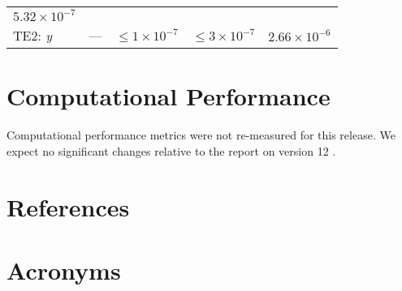 \documentclass[DM,lsstdraft,toc]{lsstdoc}
\begin{document}
\begin{longtable}[]{@{}lllll@{}}
\begin{minipage}[t]{0.22\columnwidth}
\(5.32\times 10^{-7}\)\strut
\end{minipage}\tabularnewline
\begin{minipage}[t]{0.13\columnwidth}\raggedright\strut
TE2: \emph{y}\strut
\end{minipage} & \begin{minipage}[t]{0.05\columnwidth}\raggedright\strut
---\strut
\end{minipage} & \begin{minipage}[t]{0.24\columnwidth}\raggedright\strut
\(\leq 1\times 10^{-7}\)\strut
\end{minipage} & \begin{minipage}[t]{0.21\columnwidth}\raggedright\strut
\(\leq 3\times 10^{-7}\)\strut
\end{minipage} & \begin{minipage}[t]{0.22\columnwidth}\raggedright\strut
\(2.66\times 10^{-6}\)\strut
\end{minipage}\tabularnewline
\bottomrule
\end{longtable}

\section{Computational Performance}\label{computational-performance}

Computational performance metrics were not re-measured for this release.
We expect no significant changes relative to the
report on version 12 .

\appendix
\newpage
\section{References\label{sect:references}}
\renewcommand{\refname}{}


\section{Acronyms \label{sect:acronyms}} %

\end{document}

